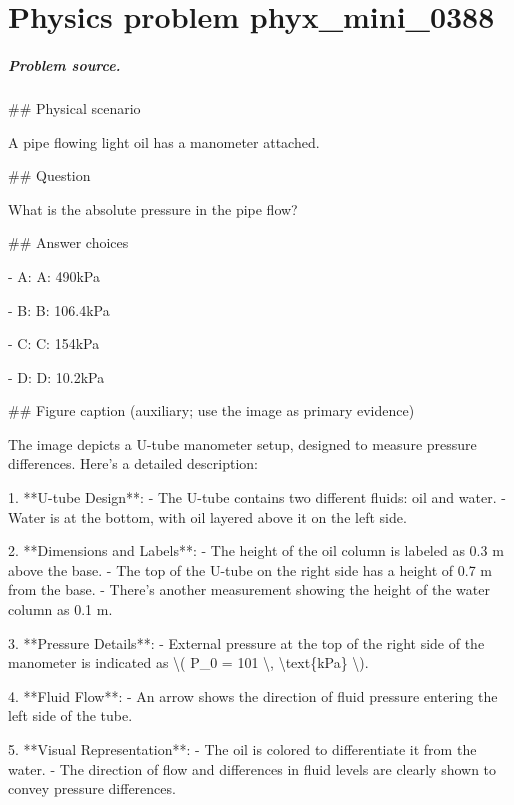 
\chapter{Physics problem phyx\_mini\_0388}
\label{ch:PhyXMiniProblems_problem_phyx_mini_0388}

\paragraph{Problem source.}
\#\# Physical scenario

A pipe flowing light oil has a manometer attached.

\#\# Question

What is the absolute pressure in the pipe flow?

\#\# Answer choices

- A: A: 490kPa

- B: B: 106.4kPa

- C: C: 154kPa

- D: D: 10.2kPa

\#\# Figure caption (auxiliary; use the image as primary evidence)

The image depicts a U-tube manometer setup, designed to measure pressure differences. Here's a detailed description:

1. **U-tube Design**: 
   - The U-tube contains two different fluids: oil and water. 
   - Water is at the bottom, with oil layered above it on the left side.

2. **Dimensions and Labels**:
   - The height of the oil column is labeled as 0.3 m above the base.
   - The top of the U-tube on the right side has a height of 0.7 m from the base.
   - There's another measurement showing the height of the water column as 0.1 m.

3. **Pressure Details**: 
   - External pressure at the top of the right side of the manometer is indicated as \textbackslash{}( P\_0 = 101 \textbackslash{}, \textbackslash{}text\{kPa\} \textbackslash{}).

4. **Fluid Flow**:
   - An arrow shows the direction of fluid pressure entering the left side of the tube.

5. **Visual Representation**:
   - The oil is colored to differentiate it from the water.
   - The direction of flow and differences in fluid levels are clearly shown to convey pressure differences.


